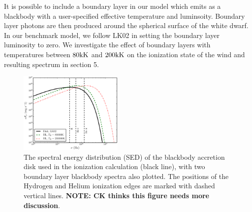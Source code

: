 \documentclass[preprint, a4paper, 11pt]{aastex}
\begin{document}
It is possible to include a boundary layer in our model which emits 
as a blackbody with a user-specified effective temperature and luminsoity.
Boundary layer photons are then produced around the spherical surface of the 
white dwarf. In our benchmark model, we follow LK02 in setting the boundary layer
luminosity to zero. We investigate the effect
of boundary layers with temperatures between $80{\rm kK}$ and $200{\rm kK}$ 
on the ionization state of the wind and resulting
spectrum in section 5.


\begin{figure}
\centering
\includegraphics[width=0.45\textwidth]{figures/sed_figure.eps}
\caption{
The spectral energy distribution (SED) of the blackbody accretion
disk used in the ionization calculation (black line), 
with two boundary layer blackbody spectra also plotted.
The positions of the Hydrogen and Helium ionization edges 
are marked with dashed vertical lines.
{\bf NOTE: CK thinks this figure needs more discussion}.
}
\label{sed}
\end{figure}


%



%

%
%
\end{document}
